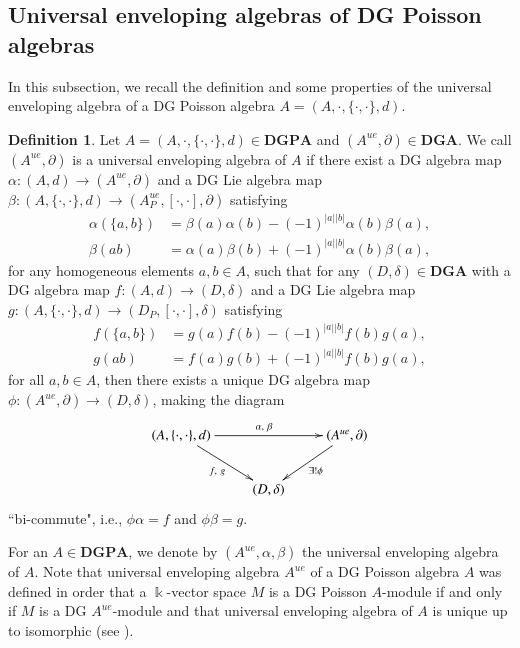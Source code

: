 \documentclass[a4paper,10pt]{amsart}
\theoremstyle{definition}
\newtheorem{defn}[theorem]{Definition}
\theoremstyle{remark}
\numberwithin{equation}{section}
\begin{document}
\subsection{Universal enveloping algebras of DG Poisson algebras}
In this subsection, we recall the definition and some properties of
the universal enveloping algebra of a DG Poisson algebra $A=(A, \cdot,
\{\cdot, \cdot\}, d)$.
\begin{defn} \cite{LWZ}
Let $A=(A, \cdot, \{\cdot, \cdot\}, d)\in \textbf{DGPA}$ and $(A^{ue},
\partial)\in \textbf{DGA}$. We call $(A^{ue}, \partial)$ is a
universal enveloping algebra of $A$ if there exist a DG algebra map
$\alpha: (A, d)\rightarrow (A^{ue}, \partial)$ and a DG Lie algebra
map $\beta: (A, \{\cdot, \cdot\}, d)\rightarrow (A_P^{ue}, [\cdot, \cdot],
\partial)$ satisfying
\begin{align*}
\alpha(\{a, b\})&=\beta(a)\alpha(b)-(-1)^{|a||b|}\alpha(b)\beta(a),\\
\beta(ab)&=\alpha(a)\beta(b)+(-1)^{|a||b|}\alpha(b)\beta(a),
\end{align*}
for any homogeneous elements $a, b\in A$, such that for any $(D,
\delta)\in \textbf{DGA}$ with a DG algebra map $f: (A, d)\rightarrow
(D, \delta)$ and a DG Lie algebra map $g: (A, \{\cdot, \cdot\}, d)\rightarrow
(D_P, [\cdot, \cdot], \delta)$ satisfying
\begin{align*}
f(\{a, b\})&=g(a)f(b)-(-1)^{|a||b|}f(b)g(a),\\
g(ab)&=f(a)g(b)+(-1)^{|a||b|}f(b)g(a),
\end{align*}
for all $a, b\in A$, then there exists a unique DG algebra map
$\phi: (A^{ue}, \partial)\rightarrow (D, \delta)$, making the diagram
\begin{eqnarray*}
\xymatrix {
 (A, \{\cdot, \cdot\}, d) \ar[rr]^{\alpha, ~\beta} \ar[dr]_{f, ~g}
                &  &    (A^{ue}, \partial) \ar[dl]^{\exists !\phi}    \\
                &   (D, \delta)               }
\end{eqnarray*}
``bi-commute", i.e., $\phi\alpha=f$ and $\phi\beta=g$.
\end{defn}
For an $A\in \textbf{DGPA}$, we denote by $(A^{ue}, \alpha, \beta)$
the universal enveloping algebra of $A$. Note that universal
enveloping algebra $A^{ue}$ of a DG Poisson algebra $A$ was defined
in order that a $\Bbbk$-vector space $M$ is a DG Poisson $A$-module
if and only if $M$ is a DG $A^{ue}$-module and that universal
enveloping algebra of $A$ is unique up to isomorphic (see \cite{LWZ}).
\end{document}
